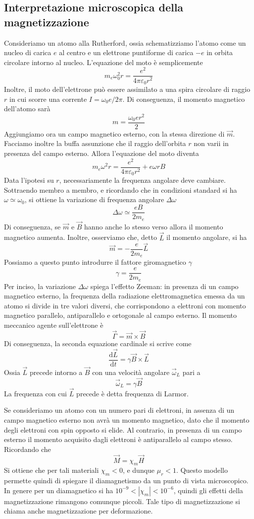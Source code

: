 \documentclass[a4paper,11pt]{book}
\newcommand{\dif}{\mathrm{d}}
\let\oldepsilon\epsilon
\let\oldvarepsilon\varepsilon
\renewcommand{\epsilon}{\oldvarepsilon}
\renewcommand{\varepsilon}{\oldepsilon}
\theoremstyle{definition}
\theoremstyle{theorem}
\begin{document}
\subsection{Interpretazione microscopica della magnetizzazione}
Consideriamo un atomo alla Rutherford, ossia schematizziamo l'atomo come un nucleo di carica $e$ al centro e un elettrone puntiforme di carica $-e$ in orbita circolare intorno al nucleo. L'equazione del moto è semplicemente
\[m_e\omega_0^2r=\frac{e^2}{4\pi\epsilon_0r^2}\]
Inoltre, il moto dell'elettrone può essere assimilato a una spira circolare di raggio $r$ in cui scorre una corrente $I=\omega_0e/2\pi$. Di conseguenza, il momento magnetico dell'atomo sarà
\[m=\frac{\omega_0er^2}{2}\]
Aggiungiamo ora un campo magnetico esterno, con la stessa direzione di $\vec{m}$. Facciamo inoltre la buffa assunzione che il raggio dell'orbita $r$ non varii in presenza del campo esterno. Allora l'equazione del moto diventa
\[m_e\omega^2r=\frac{e^2}{4\pi\epsilon_0r^2}+e\omega rB\]
Data l'ipotesi su $r$, necessariamente la frequenza angolare deve cambiare. Sottraendo membro a membro, e ricordando che in condizioni standard si ha $\omega\simeq\omega_0$, si ottiene la variazione di frequenza angolare $\Delta\omega$
\[\Delta\omega\simeq\frac{eB}{2m_e}\]
Di conseguenza, se $\vec{m}$ e $\vec{B}$ hanno anche lo stesso verso allora il momento magnetico aumenta. Inoltre, osserviamo che, detto $\vec{L}$ il momento angolare, si ha
\[\vec{m}=-\frac{e}{2m_e}\vec{L}\]
Possiamo a questo punto introdurre il fattore giromagnetico $\gamma$
\[\gamma=\frac{e}{2m_e}\]
Per inciso, la variazione $\Delta\omega$ spiega l'effetto Zeeman: in presenza di un campo magnetico esterno, la frequenza della radiazione elettromagnetica emessa da un atomo si divide in tre valori diversi, che corrispondono a elettroni con momento magnetico parallelo, antiparallelo e ortogonale al campo esterno. Il momento meccanico agente sull'elettrone è
\[\vec{\Gamma}=\vec{m}\times\vec{B}\]
Di conseguenza, la seconda equazione cardinale si scrive come
\[\frac{\dif\vec{L}}{\dif t}=\gamma\vec{B}\times\vec{L}\]
Ossia $\vec{L}$ precede intorno a $\vec{B}$ con una velocità angolare $\vec\omega_L$ pari a
\[\vec{\omega}_L=\gamma \vec{B}\]
La frequenza con cui $\vec{L}$ precede è detta frequenza di Larmor.

Se consideriamo un atomo con un numero pari di elettroni, in assenza di un campo magnetico esterno non avrà un momento magnetico, dato che il momento degli elettroni con spin opposto si elide. Al contrario, in presenza di un campo esterno il momento acquisito dagli elettroni è antiparallelo al campo stesso. Ricordando che
\[\vec{M}=\chi_m\vec{H}\]
Si ottiene che per tali materiali $\chi_m<0$, e dunque $\mu_r<1$. Questo modello permette quindi di spiegare il diamagnetismo da un punto di vista microscopico. In genere per un diamagnetico si ha $10^{-9}<|\chi_m|<10^{-6}$, quindi gli effetti della magnetizzazione rimangono comunque piccoli. Tale tipo di magnetizzazione si chiama anche magnetizzazione per deformazione.
\end{document}
